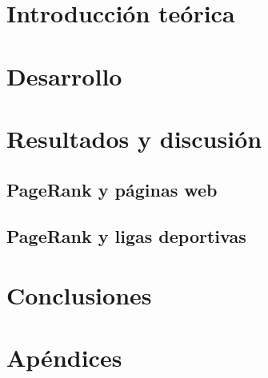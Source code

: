 \documentclass[hidelinks,a4paper,12pt, nofootinbib]{article}
\begin{document}
\maketitle

\tableofcontents
\newpage

\section{Introducción teórica}

\newpage

\section{Desarrollo}

\newpage

\section{Resultados y discusión}
\subsection{PageRank y páginas web}
\label{subsec:pagerank}


\newpage
\subsection{PageRank y ligas deportivas}

\newpage

\section{Conclusiones}

\newpage

\section{Apéndices}

\end{document}
